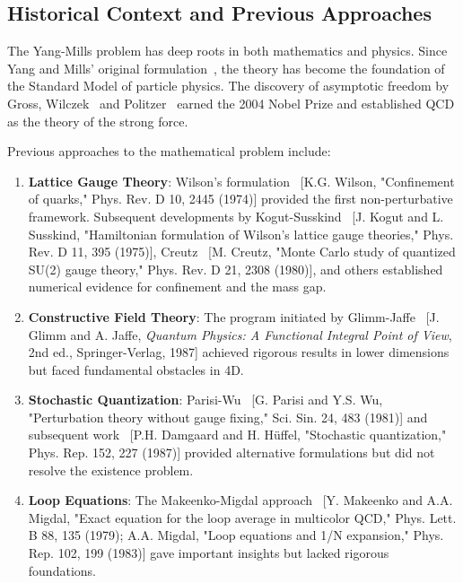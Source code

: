 \documentclass[12pt]{article}
\begin{document}
\subsection{Historical Context and Previous Approaches}

The Yang-Mills problem has deep roots in both mathematics and physics. Since Yang and Mills' original formulation~\cite{yang1954conservation}, the theory has become the foundation of the Standard Model of particle physics. The discovery of asymptotic freedom by Gross, Wilczek~\cite{gross1973ultraviolet} and Politzer~\cite{politzer1973reliable} earned the 2004 Nobel Prize and established QCD as the theory of the strong force.

Previous approaches to the mathematical problem include:

\begin{enumerate}
\item \textbf{Lattice Gauge Theory}: Wilson's formulation~\cite{wilson1974confinement} [K.G. Wilson, "Confinement of quarks," Phys. Rev. D 10, 2445 (1974)] provided the first non-perturbative framework. Subsequent developments by Kogut-Susskind~\cite{kogut1975hamiltonian} [J. Kogut and L. Susskind, "Hamiltonian formulation of Wilson's lattice gauge theories," Phys. Rev. D 11, 395 (1975)], Creutz~\cite{creutz1980monte} [M. Creutz, "Monte Carlo study of quantized SU(2) gauge theory," Phys. Rev. D 21, 2308 (1980)], and others established numerical evidence for confinement and the mass gap.

\item \textbf{Constructive Field Theory}: The program initiated by Glimm-Jaffe~\cite{glimm1987quantum} [J. Glimm and A. Jaffe, \textit{Quantum Physics: A Functional Integral Point of View}, 2nd ed., Springer-Verlag, 1987] achieved rigorous results in lower dimensions but faced fundamental obstacles in 4D.

\item \textbf{Stochastic Quantization}: Parisi-Wu~\cite{parisi1981perturbation} [G. Parisi and Y.S. Wu, "Perturbation theory without gauge fixing," Sci. Sin. 24, 483 (1981)] and subsequent work~\cite{damgaard1987stochastic} [P.H. Damgaard and H. Hüffel, "Stochastic quantization," Phys. Rep. 152, 227 (1987)] provided alternative formulations but did not resolve the existence problem.

\item \textbf{Loop Equations}: The Makeenko-Migdal approach~\cite{makeenko1979exact,migdal1983loop} [Y. Makeenko and A.A. Migdal, "Exact equation for the loop average in multicolor QCD," Phys. Lett. B 88, 135 (1979); A.A. Migdal, "Loop equations and 1/N expansion," Phys. Rep. 102, 199 (1983)] gave important insights but lacked rigorous foundations.
\end{enumerate}
\end{document}
